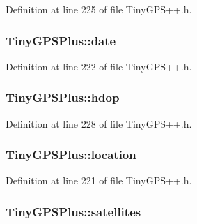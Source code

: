 Definition at line 225 of file Tiny\+G\+P\+S++.\+h.

\subsubsection[{\texorpdfstring{date}{date}}]{ Tiny\+G\+P\+S\+Plus\+::date}\hypertarget{class_tiny_g_p_s_plus_a83a70812b432d7f51c7c735bfe7be0f0}{}\label{class_tiny_g_p_s_plus_a83a70812b432d7f51c7c735bfe7be0f0}


Definition at line 222 of file Tiny\+G\+P\+S++.\+h.

\subsubsection[{\texorpdfstring{hdop}{hdop}}]{ Tiny\+G\+P\+S\+Plus\+::hdop}\hypertarget{class_tiny_g_p_s_plus_a3a21b3ae7085bb278b35d703bf135632}{}\label{class_tiny_g_p_s_plus_a3a21b3ae7085bb278b35d703bf135632}


Definition at line 228 of file Tiny\+G\+P\+S++.\+h.

\subsubsection[{\texorpdfstring{location}{location}}]{ Tiny\+G\+P\+S\+Plus\+::location}\hypertarget{class_tiny_g_p_s_plus_a886255f412f8e01f84e5104d36315fb3}{}\label{class_tiny_g_p_s_plus_a886255f412f8e01f84e5104d36315fb3}


Definition at line 221 of file Tiny\+G\+P\+S++.\+h.

\subsubsection[{\texorpdfstring{satellites}{satellites}}]{ Tiny\+G\+P\+S\+Plus\+::satellites}\hypertarget{class_tiny_g_p_s_plus_a5fb47066d1d03f4bb5853529053aab48}{}\label{class_tiny_g_p_s_plus_a5fb47066d1d03f4bb5853529053aab48}


